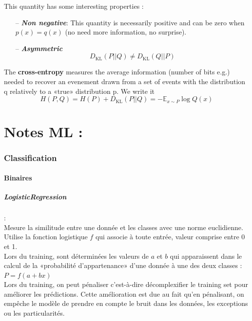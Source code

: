 \documentclass[a4paper,12pt]{report}
\newcommand{\bepar}[1]{
	\left( #1 \right)  
}
\newcommand\bk{\color{black}}
\newcommand\brick{\color{brick}}
\newcommand\navy{\color{navy}}
\newcommand{\cad}{c'est-à-dire}
\numberwithin{equation}{section} %
\begin{document}
\noindent This quantity has some interesting properties :
\begin{itemize}
 \item[--] \textit{\textbf{Non negative}}: This quantity is necessarily positive and can be zero when $p(x) = q(x)$ (no need more information, no surprise). \\[1mm]
 \item[--] \textbf{\textit{Asymmetric}}$$ D_{\text{KL}}\bepar{P||Q} \neq D_{\text{KL}}\bepar{Q||P} $$
\end{itemize}

\noindent The \textbf{cross-entropy} measures the average information (number of bits e.g.) needed to recover an evenement drawn from a set of events with the distribution q relatively to a «true» distribution p. We write it $$ H(P,Q) = H(P) + D_{\text{KL}}\bepar{P||Q} = -\mathbb{E}_{x\sim P} \log Q(x)$$  

\navy \chapter{Notes ML : \cite{muller2016introduction}} \bk
\brick \subsection{Classification}\bk
\subsubsection{Binaires}
\navy \paragraph*{LogisticRegression} :\bk \\
\noindent Mesure la similitude entre une donnée et les classes avec une norme euclidienne.\\
Utilise la fonction logistique $f$ qui associe à toute entrée, valeur comprise entre 0 et 1.\\
Lors du training, sont déterminées les valeurs de $a$ et $b$ qui apparaissent dans le calcul de la «probabilité d'appartenance» d'une donnée à une des deux classes : $P = f\bepar{a+bx}$\\

\noindent Lors du training, on peut pénaliser \cad $ $ décomplexifier le training set pour améliorer les prédictions. Cette amélioration est due au fait qu'en pénalisant, on empêche le modèle de prendre en compte le bruit dans les données, les exceptions ou les particularités.
\end{document}
